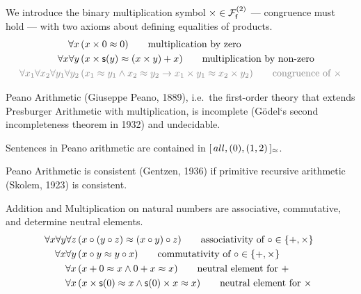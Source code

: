 \begin{definition}
	[Multiplication]\label{tab:addition:axioms}
	We introduce the binary multiplication symbol \( \times\in\mcFfn[2] \)
	--- congruence must hold ---
	with two axioms about defining equalities of products.
	\begin{align*}
	\forall x\,
	&(x\times 0 \mEQ 0)
	\tag*{multiplication by zero}\\
	\forall x\forall y\,
	&(x\times\msucc(y) \mEQ (x\times y) + x)
	\tag*{multiplication by non-zero}
	\\
	\colG\forall x_1\forall x_2\forall y_1\forall y_2\,
	&\colG (x_1\mEQ y_1\land x_2\mEQ y_2 \limp x_1\times y_1\mEQ x_2 \times y_2)
	\tag*{congruence of \( \times \)}
	\end{align*}
\end{definition}

\begin{theorem}Peano Arithmetic (Giuseppe Peano, 1889),
	i.e.\ the first-order theory that extends Presburger Arithmetic with multiplication, is incomplete (Gödel`s second incompleteness theorem in 1932) and undecidable.
\end{theorem}

\begin{remark}
	Sentences in Peano arithmetic are contained in
	\( [ \, all , (0), (1,2) \, ]{}_{\mEQ} \).
\end{remark}

\begin{theorem}
	Peano Arithmetic is consistent (Gentzen, 1936)
	if primitive recursive arithmetic (Skolem, 1923) is consistent.
\end{theorem}

\begin{lemma}[ACN]\label{lem:acn}
	Addition and Multiplication on natural numbers are associative, commutative,
	and determine neutral elements.
	\begin{align*}
	\forall x\forall y\forall z\,&(x\circ(y\circ z) \mEQ (x\circ y)\circ z)
	\tag*{associativity of \( \circ\in \{ +,\times \} \) }
	\\
	\forall x\forall y\,&(x\circ y \mEQ y\circ x)
	\tag*{commutativity of \( \circ\in \{ +, \times \} \)}
	\\
	\forall x\,&(x + 0\mEQ x \land 0 + x \mEQ x )
	\tag*{neutral element for \( + \)}
	\\
	\forall x\,&(x \times \msucc(0)\mEQ x \land \msucc(0) \times x \mEQ x )
	\tag*{neutral element for \( \times \)}
	\end{align*}
\end{lemma}

